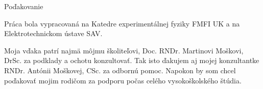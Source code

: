 \documentclass[
	11pt, %
]{beamer}
\begin{document}
\begin{frame}[plain] %
	\begin{center}
		{\Huge Poďakovanie}
		
		\bigskip\bigskip %
	\end{center}
Práca bola vypracovaná na Katedre experimentálnej fyziky FMFI UK a na Elektrotechnickom ústave SAV.

Moja vďaka patrí najmä môjmu školiteľovi, Doc. RNDr. Martinovi Moškovi, DrSc. za podklady a ochotu konzultovať.
Tak isto ďakujem aj mojej konzultantke RNDr. Antónii Moškovej, CSc. za odbornú pomoc. Napokon by som chcel poďakovať mojim rodičom
za podporu počas celého vysokoškolského štúdia.
\end{frame}

\end{document}
